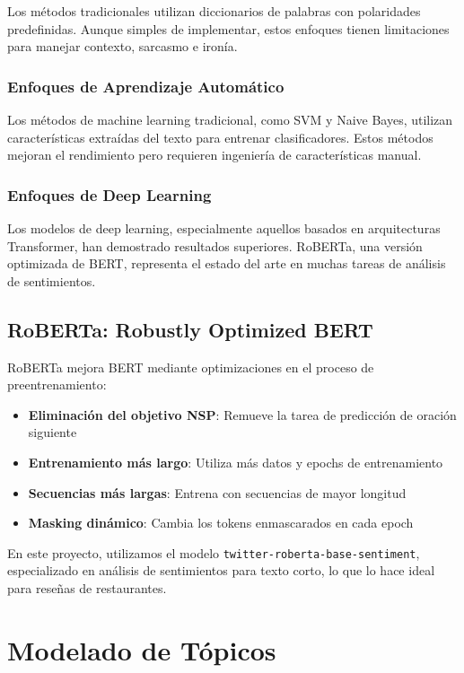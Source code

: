 \documentclass[12pt,a4paper,twoside,openany]{book}
\begin{document}
Los métodos tradicionales utilizan diccionarios de palabras con polaridades predefinidas. Aunque simples de implementar, estos enfoques tienen limitaciones para manejar contexto, sarcasmo e ironía.

\subsubsection{Enfoques de Aprendizaje Automático}

Los métodos de machine learning tradicional, como SVM y Naive Bayes, utilizan características extraídas del texto para entrenar clasificadores. Estos métodos mejoran el rendimiento pero requieren ingeniería de características manual.

\subsubsection{Enfoques de Deep Learning}

Los modelos de deep learning, especialmente aquellos basados en arquitecturas Transformer, han demostrado resultados superiores. RoBERTa, una versión optimizada de BERT, representa el estado del arte en muchas tareas de análisis de sentimientos.

\subsection{RoBERTa: Robustly Optimized BERT}

RoBERTa mejora BERT mediante optimizaciones en el proceso de preentrenamiento:

\begin{itemize}
    \item \textbf{Eliminación del objetivo NSP}: Remueve la tarea de predicción de oración siguiente
    \item \textbf{Entrenamiento más largo}: Utiliza más datos y epochs de entrenamiento
    \item \textbf{Secuencias más largas}: Entrena con secuencias de mayor longitud
    \item \textbf{Masking dinámico}: Cambia los tokens enmascarados en cada epoch
\end{itemize}

En este proyecto, utilizamos el modelo \texttt{twitter-roberta-base-sentiment}, especializado en análisis de sentimientos para texto corto, lo que lo hace ideal para reseñas de restaurantes.

\section{Modelado de Tópicos}
\end{document}
